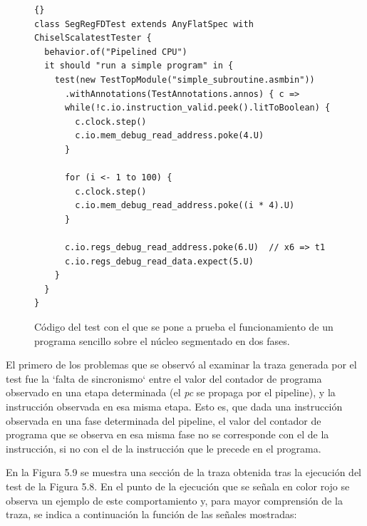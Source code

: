 \begin{figure}[h!]
\begin{lstlisting}[style=scalaStyle,columns=fullflexible]{}
class SegRegFDTest extends AnyFlatSpec with ChiselScalatestTester {
  behavior.of("Pipelined CPU")
  it should "run a simple program" in {
    test(new TestTopModule("simple_subroutine.asmbin"))
      .withAnnotations(TestAnnotations.annos) { c =>
      while(!c.io.instruction_valid.peek().litToBoolean) {
        c.clock.step()
        c.io.mem_debug_read_address.poke(4.U)
      }
      
      for (i <- 1 to 100) {
        c.clock.step()
        c.io.mem_debug_read_address.poke((i * 4).U)
      }

      c.io.regs_debug_read_address.poke(6.U)  // x6 => t1
      c.io.regs_debug_read_data.expect(5.U)
    }
  }
}
\end{lstlisting}
\vspace{-0.1cm}
\caption{Código del test con el que se pone a prueba el funcionamiento de un programa sencillo sobre el núcleo segmentado en dos fases.}
\end{figure}

\vspace{+0.1cm}

El primero de los problemas que se observó al examinar la traza generada por el test fue la `falta de sincronismo` entre el valor del contador de programa observado en una etapa determinada (el \textit{pc} se propaga por el pipeline), y la instrucción observada en esa misma etapa. Esto es, que dada una instrucción observada en una fase determinada del pipeline, el valor del contador de programa que se observa en esa misma fase no se corresponde con el de la instrucción, si no con el de la instrucción que le precede en el programa.

En la Figura 5.9 se muestra una sección de la traza obtenida tras la ejecución del test de la Figura 5.8. En el punto de la ejecución que se señala en color rojo se observa un ejemplo de este comportamiento y, para mayor comprensión de la traza, se indica a continuación la función de las señales mostradas:

